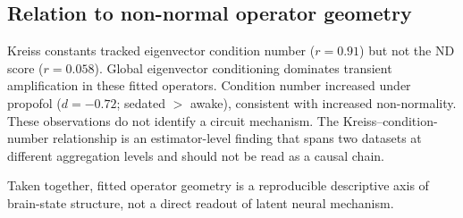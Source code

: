 \documentclass[preprint,12pt,nonatbib]{elsarticle}
\begin{document}
\subsection{Relation to non-normal operator geometry}
Kreiss constants tracked eigenvector condition number ($r=0.91$) but not the ND score ($r=0.058$). Global eigenvector conditioning dominates transient amplification in these fitted operators. Condition number increased under propofol ($d=-0.72$; sedated $>$ awake), consistent with increased non-normality. These observations do not identify a circuit mechanism. The Kreiss--condition-number relationship is an estimator-level finding that spans two datasets at different aggregation levels and should not be read as a causal chain.

Taken together, fitted operator geometry is a reproducible descriptive axis of brain-state structure, not a direct readout of latent neural mechanism.
\end{document}
